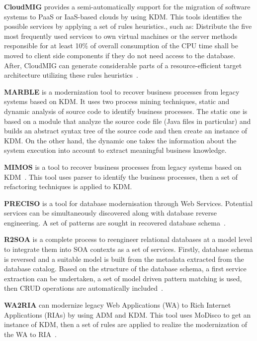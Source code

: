 \textbf{CloudMIG} provides a semi-automatically support for the migration of software systems to PaaS or IaaS-based clouds by using KDM. This tools identifies the possible services by applying a set of rules heuristics., such as: Distribute the five most frequently used services to own virtual machines or the server methods responsible for at least 10\% of overall consumption of the CPU time shall be moved to client side components if they do not need access to the database. After, CloudMIG can generate considerable parts of a resource-efficient target architecture utilizing these rules heuristics~\cite{SMR:SMR582}. 


\textbf{MARBLE} is a modernization tool to recover business processes from legacy systems based on KDM. It uses two process mining techniques, static and dynamic analysis of source code to identify business processes. The static one is based on a module that analyze the source code file (Java files in particular) and builds an abstract syntax tree of the source code and then create an instance of KDM. On the other hand, the dynamic one takes the information about the system execution into account to extract meaningful business knowledge.

\textbf{MIMOS} is a tool to recover business processes from legacy systems based on KDM~\cite{6498507}. This tool uses parser to identify the business processes, then a set of refactoring techniques is applied to KDM.

\textbf{PRECISO} is a tool for database modernisation through Web Services. Potential services can be simultaneously discovered along with database reverse engineering. A set of patterns are sought in recovered database schema~\cite{delCastillo:2009:PRP:1529282.1529753}.

\textbf{R2SOA} is a complete process to reengineer relational databases at a model level to integrate them into SOA contexts as a set of services. Firstly, database schema is reversed and a suitable model is built from the metadata extracted from the database catalog. Based on the structure of the database schema, a first service extraction can be undertaken, a set of model driven pattern matching is used, then CRUD operations are automatically included~\cite{Guzman:2007:AAR:1339262.1339532}.

\textbf{WA2RIA} can modernize legacy Web Applications (WA) to Rich Internet Applications (RIAs) by using ADM and KDM. This tool uses MoDisco to get an instance of KDM, then a set of rules are applied to realize the modernization of the WA to RIA~\cite{Rodriguez-Echeverria:2011:MLW:2186508.2186536}.

